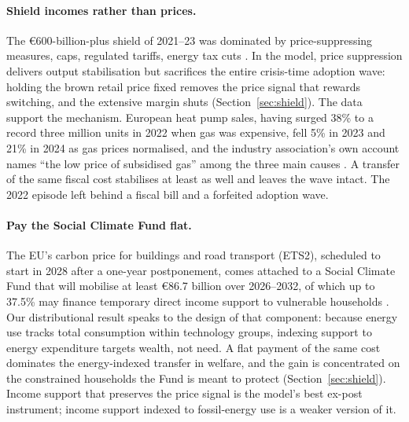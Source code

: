 \paragraph{Shield incomes rather than prices.} The \euro{600}-billion-plus shield of
2021--23 was dominated by price-suppressing measures, caps, regulated tariffs,
energy tax cuts \citep{Bruegel2023}. In the model, price suppression delivers output stabilisation but sacrifices the
entire crisis-time adoption wave: holding the brown retail price fixed removes the
price signal that rewards switching, and the extensive margin shuts
(Section~\ref{sec:shield}). The
data support the mechanism. European heat pump sales, having surged 38\% to a
record three million units in 2022 when gas was expensive, fell 5\% in 2023 and
21\% in 2024 as gas prices normalised, and the industry association's own account
names ``the low price of subsidised gas'' among the three main causes
\citep{EHPA2024,EHPA2025}. A transfer of the same fiscal cost stabilises at
least as well and leaves the wave intact. The 2022 episode left behind a fiscal bill and a forfeited adoption wave.

\paragraph{Pay the Social Climate Fund flat.} The EU's carbon price for
buildings and road transport (ETS2), scheduled to start in 2028 after a
one-year postponement, comes attached to a Social Climate Fund that will
mobilise at least \euro{86.7} billion over 2026--2032, of which up to 37.5\%
may finance temporary direct income support to vulnerable households
\citep{ECETS2}. Our distributional result speaks to the design of that component:
because energy use tracks total consumption within technology groups, indexing
support to energy expenditure targets wealth, not need. A flat payment of the
same cost dominates the energy-indexed transfer in welfare, and the gain is
concentrated on the constrained households the Fund is meant to
protect (Section~\ref{sec:shield}). Income support that preserves the price
signal is the model's best ex-post instrument; income support indexed to
fossil-energy use is a weaker version of it.

